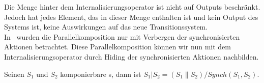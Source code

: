 Die Menge hinter dem Internalisierungsoperator ist nicht auf Outputs
beschränkt. Jedoch hat jedes Element, das in dieser Menge enthalten ist und
kein Output des Systems ist, keine Auswirkungen auf das neue
Transitionssystem.\\
In~\cite{Vogler2014EIO} wurden die Parallelkomposition nur mit Verbergen der
synchronisierten Aktionen betrachtet. Diese Parallelkomposition können wir nun
mit dem Internalisierungsoperator durch Hiding der synchronisierten Aktionen
nachbilden.

\begin{Def}
  \label{defIntParal}
  Seinen $S_1$ und $S_2$ komponierbare \EIO{}s, dann ist
  $S_1|S_2=(S_1\|S_2)/Synch(S_1,S_2)$.
\end{Def}
